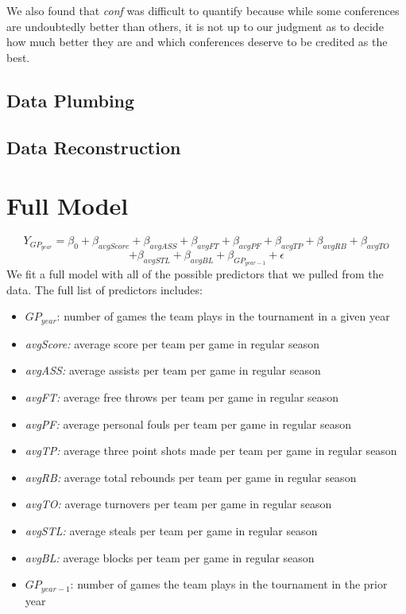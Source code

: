 \documentclass[]{scrartcl}
\begin{document}
We also found that {\textit{conf}} was difficult to quantify because while some conferences are undoubtedly better than others, it is not up to our judgment as to decide how much better they are and which conferences deserve to be credited as the best.
\subsection*{Data Plumbing}
\subsection*{Data Reconstruction}
\section*{Full Model}
	\[
Y_{GP_{year}} = \beta_0 + \beta_{avgScore} + \beta_{avgASS} +\beta_{avgFT} + \beta_{avgPF} + \beta_{avgTP} + \beta_{avgRB} + \beta_{avgTO}
\] 
\[
+ \beta_{avgSTL} +\beta_{avgBL} + \beta_{GP_{year-1}}+ \epsilon
\]
We fit a full model with all of the possible predictors that we pulled from the data. The full list of predictors includes:
	\begin{itemize}
	\item 	{$GP_{year}$:} number of games the team plays in the tournament in a given year
	\item 	{\textit{avgScore:}} average score per team per game in regular season
	\item 	{\textit{avgASS:}} average assists per team per game in regular season
	\item 	{\textit{avgFT:}} average free throws per team per game in regular season
	\item 	{\textit{avgPF:}} average personal fouls per team per game in regular season
	\item 	{\textit{avgTP:}} average three point shots made per team per game in regular season
	\item 	{\textit{avgRB:}} average total rebounds per team per game in regular season
	\item 	{\textit{avgTO:}} average turnovers per team per game in regular season
	\item 	{\textit{avgSTL:}} average steals per team per game in regular season
	\item 	{\textit{avgBL:}} average blocks per team per game in regular season
	\item 	{$GP_{year-1}$:} number of games the team plays in the tournament in the prior year
	\end{itemize}
\end{document}
